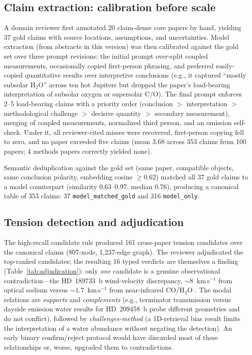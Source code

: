 \subsection{Claim extraction: calibration before scale}
\label{sec:experiments:claims}

A domain reviewer first annotated 20 claim-dense core papers by hand,
yielding 37 gold claims with source locations, assumptions, and
uncertainties. Model extraction (from abstracts in this version) was
then calibrated against the gold set over three prompt revisions:
the initial prompt over-split coupled measurements, occasionally copied
first-person phrasing, and preferred easily-copied quantitative results
over interpretive conclusions (e.g., it captured ``mostly subsolar
H$_2$O'' across ten hot Jupiters \citep{pinhas2019} but dropped the
paper's load-bearing interpretation of subsolar oxygen or supersolar
C/O). The final prompt enforces 2--5 load-bearing claims with a priority
order (conclusion $>$ interpretation $>$ methodological challenge $>$
decisive quantity $>$ secondary measurement), merging of coupled
measurements, normalized third person, and an omission self-check.
Under it, all reviewer-cited misses were recovered, first-person copying
fell to zero, and no paper exceeded five claims (mean 3.68 across
353 claims from 100 papers; 4 methods papers correctly yielded none).

Semantic deduplication against the gold set (same paper, compatible
objects, same conclusion polarity, embedding cosine $\ge 0.62$) matched
all 37 gold claims to a model counterpart (similarity 0.63--0.97, median
0.76), producing a canonical table of 353 claims: 37
\texttt{model\_matched\_gold} and 316 \texttt{model\_only}.

\subsection{Tension detection and adjudication}
\label{sec:experiments:tension}

The high-recall candidate rule produced 161 cross-paper tension
candidates over the canonical claims (807-node, 1{,}237-edge graph).
The reviewer adjudicated the top-ranked candidates; the resulting
16 typed verdicts are themselves a finding
(Table~\ref{tab:adjudication}): only \emph{one} candidate is a genuine
observational contradiction---the HD~189733~b wind-velocity discrepancy,
${\sim}8$~km\,s$^{-1}$ from optical sodium \citep{wyttenbach2015} versus
${\sim}1.7$~km\,s$^{-1}$ from near-infrared CO/H$_2$O
\citep{brogi2016}. The modal relations are \textit{supports} and
\textit{complements} (e.g., terminator transmission versus dayside
emission water results for HD~209458~b probe different geometries and do
not conflict), followed by \textit{challenges-method} (a 1D-retrieval
bias result \citep{macdonald2020} limits the interpretation of a water
abundance \citep{kreidberg2015} without negating the detection). An
early binary confirm/reject protocol would have discarded most of these
relationships or, worse, upgraded them to contradictions.

